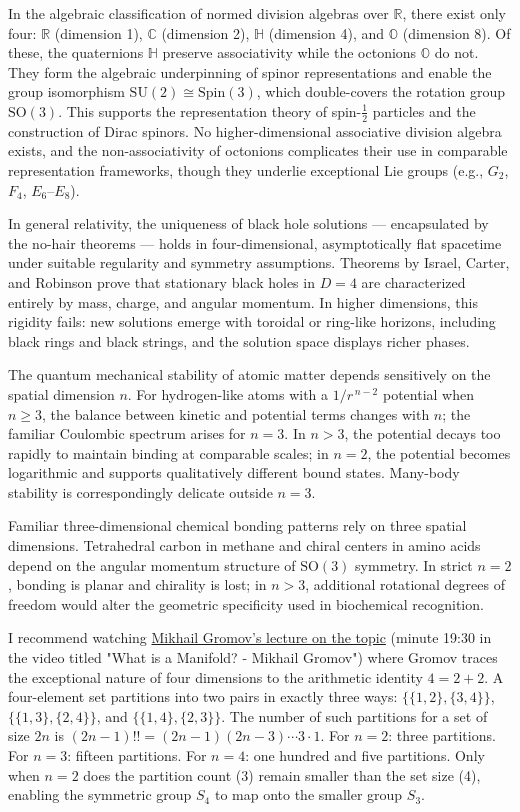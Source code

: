 In the algebraic classification of normed division algebras over $\mathbb{R}$, there exist only four: $\mathbb{R}$ (dimension 1), $\mathbb{C}$ (dimension 2), $\mathbb{H}$ (dimension 4), and $\mathbb{O}$ (dimension 8). Of these, the quaternions $\mathbb{H}$ preserve associativity while the octonions $\mathbb{O}$ do not. They form the algebraic underpinning of spinor representations and enable the group isomorphism $\mathrm{SU}(2) \cong \mathrm{Spin}(3)$, which double-covers the rotation group $\mathrm{SO}(3)$. This supports the representation theory of spin-$\tfrac{1}{2}$ particles and the construction of Dirac spinors. No higher-dimensional associative division algebra exists, and the non-associativity of octonions complicates their use in comparable representation frameworks, though they underlie exceptional Lie groups (e.g., $G_2$, $F_4$, $E_6$–$E_8$).

In general relativity, the uniqueness of black hole solutions — encapsulated by the no-hair theorems — holds in four-dimensional, asymptotically flat spacetime under suitable regularity and symmetry assumptions. Theorems by Israel, Carter, and Robinson prove that stationary black holes in $D=4$ are characterized entirely by mass, charge, and angular momentum. In higher dimensions, this rigidity fails: new solutions emerge with toroidal or ring-like horizons, including black rings and black strings, and the solution space displays richer phases.

The quantum mechanical stability of atomic matter depends sensitively on the spatial dimension $n$. For hydrogen-like atoms with a $1/r^{\,n-2}$ potential when $n\ge 3$, the balance between kinetic and potential terms changes with $n$; the familiar Coulombic spectrum arises for $n=3$. In $n>3$, the potential decays too rapidly to maintain binding at comparable scales; in $n=2$, the potential becomes logarithmic and supports qualitatively different bound states. Many-body stability is correspondingly delicate outside $n=3$.

Familiar three-dimensional chemical bonding patterns rely on three spatial dimensions. Tetrahedral carbon in methane and chiral centers in amino acids depend on the angular momentum structure of $\mathrm{SO}(3)$ symmetry. In strict $n=2$, bonding is planar and chirality is lost; in $n>3$, additional rotational degrees of freedom would alter the geometric specificity used in biochemical recognition.

I recommend watching \href{http://youtu.be/u5DLpAqX4YA&t=1170s}{Mikhail Gromov's lecture on the topic} (minute 19:30 in the video titled "What is a Manifold? - Mikhail Gromov") where Gromov traces the exceptional nature of four dimensions to the arithmetic identity $4 = 2 + 2$. A four-element set partitions into two pairs in exactly three ways: $\{\{1,2\}, \{3,4\}\}$, $\{\{1,3\}, \{2,4\}\}$, and $\{\{1,4\}, \{2,3\}\}$. The number of such partitions for a set of size $2n$ is $(2n-1)!! = (2n-1)(2n-3)\cdots 3 \cdot 1$. For $n=2$: three partitions. For $n=3$: fifteen partitions. For $n=4$: one hundred and five partitions. Only when $n=2$ does the partition count (3) remain smaller than the set size (4), enabling the symmetric group $S_4$ to map onto the smaller group $S_3$.

